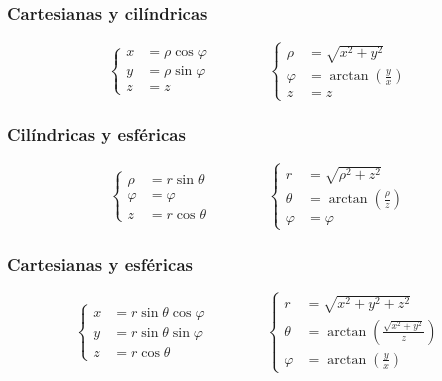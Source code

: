 \documentclass[12pt, a4paper]{article}
\begin{document}
\subsubsection{Cartesianas y cilíndricas}

\begin{equation}
    \left\lbrace 
    \begin{aligned}
        x &= \rho \cos \varphi \\
        y &= \rho \sin \varphi \\
        z &= z
    \end{aligned} \right. \qquad \qquad \left\lbrace 
    \begin{aligned}
        \rho &= \sqrt{x^2 + y^2} \\
        \varphi &= \arctan \left( \frac{y}{x} \right) \\
        z &= z
    \end{aligned} \right.
\end{equation}

\subsubsection{Cilíndricas y esféricas}

\begin{equation}
    \left\lbrace 
    \begin{aligned}
        \rho &= r \sin \theta \\
        \varphi &= \varphi \\
        z &= r \cos \theta
    \end{aligned} \right. \qquad \qquad \left\lbrace 
    \begin{aligned}
        r &= \sqrt{\rho^2 + z^2} \\
        \theta &= \arctan \left( \frac{\rho}{z} \right) \\
        \varphi &= \varphi
    \end{aligned} \right.
\end{equation}

\subsubsection{Cartesianas y esféricas}

\begin{equation}
    \left\lbrace 
    \begin{aligned}
        x &= r \sin \theta \cos \varphi \\
        y &= r \sin \theta \sin \varphi \\
        z &= r \cos \theta
    \end{aligned} \right. \qquad \qquad \left\lbrace 
    \begin{aligned}
        r &= \sqrt{x^2 + y^2 + z^2} \\
        \theta &= \arctan \left( \frac{\sqrt{x^2 + y^2}}{z} \right) \\
        \varphi &= \arctan \left( \frac{y}{x} \right)
    \end{aligned} \right.
\end{equation}
\end{document}
